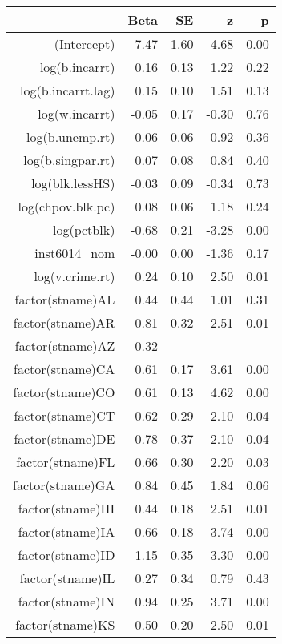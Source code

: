 \begin{table}[ht]
\centering
\begin{tabular}{rrrrr}
  \hline
 & Beta & SE & z & p \\ 
  \hline
(Intercept) & -7.47 & 1.60 & -4.68 & 0.00 \\ 
  log(b.incarrt) & 0.16 & 0.13 & 1.22 & 0.22 \\ 
  log(b.incarrt.lag) & 0.15 & 0.10 & 1.51 & 0.13 \\ 
  log(w.incarrt) & -0.05 & 0.17 & -0.30 & 0.76 \\ 
  log(b.unemp.rt) & -0.06 & 0.06 & -0.92 & 0.36 \\ 
  log(b.singpar.rt) & 0.07 & 0.08 & 0.84 & 0.40 \\ 
  log(blk.lessHS) & -0.03 & 0.09 & -0.34 & 0.73 \\ 
  log(chpov.blk.pc) & 0.08 & 0.06 & 1.18 & 0.24 \\ 
  log(pctblk) & -0.68 & 0.21 & -3.28 & 0.00 \\ 
  inst6014\_nom & -0.00 & 0.00 & -1.36 & 0.17 \\ 
  log(v.crime.rt) & 0.24 & 0.10 & 2.50 & 0.01 \\ 
  factor(stname)AL & 0.44 & 0.44 & 1.01 & 0.31 \\ 
  factor(stname)AR & 0.81 & 0.32 & 2.51 & 0.01 \\ 
  factor(stname)AZ & 0.32 &  &  &  \\ 
  factor(stname)CA & 0.61 & 0.17 & 3.61 & 0.00 \\ 
  factor(stname)CO & 0.61 & 0.13 & 4.62 & 0.00 \\ 
  factor(stname)CT & 0.62 & 0.29 & 2.10 & 0.04 \\ 
  factor(stname)DE & 0.78 & 0.37 & 2.10 & 0.04 \\ 
  factor(stname)FL & 0.66 & 0.30 & 2.20 & 0.03 \\ 
  factor(stname)GA & 0.84 & 0.45 & 1.84 & 0.06 \\ 
  factor(stname)HI & 0.44 & 0.18 & 2.51 & 0.01 \\ 
  factor(stname)IA & 0.66 & 0.18 & 3.74 & 0.00 \\ 
  factor(stname)ID & -1.15 & 0.35 & -3.30 & 0.00 \\ 
  factor(stname)IL & 0.27 & 0.34 & 0.79 & 0.43 \\ 
  factor(stname)IN & 0.94 & 0.25 & 3.71 & 0.00 \\ 
  factor(stname)KS & 0.50 & 0.20 & 2.50 & 0.01 \\ 

\end{tabular}
\end{table}
